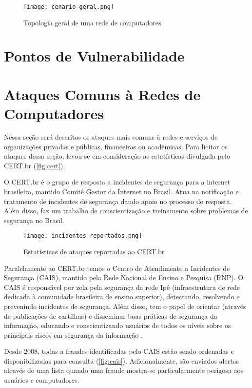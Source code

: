 \begin{figure}[htb]
    \centering
    \caption{Topologia geral de uma rede de computadores} 
    \texttt{[image: cenario-geral.png]}
    \label{fig:cenario-geral}
\end{figure}

\section{Pontos de Vulnerabilidade} \label{sec:pontos-vulnerabilidade}
\section{Ataques Comuns à Redes de Computadores} \label{sec:ataques-comuns}

Nessa seção será descritos os ataques mais comuns à redes e serviços de organizações privadas e públicas, financeiras ou acadêmicas. Para licitar os ataques dessa seção, levou-se em consideração as estatísticas divulgada pelo CERT.br (\autoref{fig:cert}).

O CERT.br é o grupo de resposta a incidentes de segurança para a internet brasileira, mantido Comitê Gestor da Internet no Brasil. Atua na notificação e tratamento de incidentes de segurança dando apoio no processo de resposta. Além disso, faz um trabalho de conscientização e treinamento sobre problemas de segurança no Brasil. 

\begin{figure}[htb]
 \centering
 \caption{Estatísticas de ataques reportadas ao CERT.br}
 \texttt{[image: incidentes-reportados.png]}
 \label{fig:cert}
\end{figure}

Paralelamente ao CERT.br temos o Centro de Atendimento a Incidentes de Segurança (CAIS), mantido pela Rede Nacional de Ensino e Pesquisa (RNP). O CAIS é responsável por zela pela segurança da rede Ipê (infraestrutura de rede dedicada à comunidade brasileira de ensino superior), detectando, resolvendo e prevenindo incidentes de segurança. Além disso, tem o papel de orientar (através de publicações de cartilhas) e disseminar boas práticas de segurança da informação, educando e conscientizando usuários de todos os níveis sobre os principais riscos em segurança da informação \cite{cais}.

Desde 2008, todas a fraudes identificadas pelo CAIS estão sendo ordenadas e disponibilizadas para consulta (\autoref{fig:cais}). Adicionalmente, são enviados alertas através de uma lista quando uma fraude mostra-se particularmente perigosa aos usuários e computadores.


